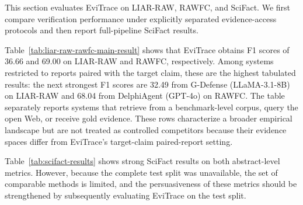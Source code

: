\documentclass[letterpaper]{article}
\begin{document}


This section evaluates EviTrace on LIAR-RAW, RAWFC, and SciFact. We
first compare verification performance under explicitly separated
evidence-access protocols and then report full-pipeline SciFact results.

Table~\ref{tab:liar-raw-rawfc-main-result} shows that EviTrace obtains F1
scores of 36.66 and 69.00 on LIAR-RAW and RAWFC, respectively. Among
systems restricted to reports paired with the target claim, these are
the highest tabulated results: the next strongest F1 scores are 32.49
from G-Defense (LLaMA-3.1-8B) on LIAR-RAW and 68.04 from
DelphiAgent (GPT-4o) on RAWFC. The table separately reports
systems that retrieve from a benchmark-level corpus, query the open Web,
or receive gold evidence. These rows characterize a broader empirical
landscape but are not treated as controlled competitors because their
evidence spaces differ from EviTrace's target-claim paired-report setting.

Table~\ref{tab:scifact-results} shows strong SciFact results on both abstract-level metrics. However, because the complete test split was unavailable, the set of comparable methods is limited, and the persuasiveness of these metrics should be strengthened by subsequently evaluating EviTrace on the test split.
\end{document}
